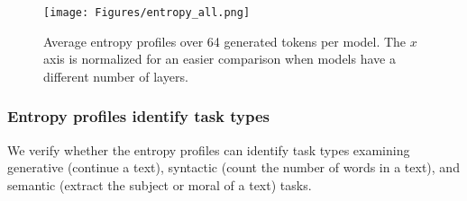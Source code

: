 
\begin{figure}[ht]
    \centering
    \texttt{[image: Figures/entropy\_all.png]}
    \caption{Average entropy profiles over 64 generated tokens per model. The $x$ axis is normalized for an easier comparison when models have a different number of layers.}
    \label{fig:entropy_fingerprints}
\end{figure}

\subsubsection{Entropy profiles identify task types} \label{sec:exp-ts}
We verify whether the entropy profiles can identify task types examining generative (continue a text), syntactic (count the number of words in a text), and semantic (extract the subject or moral of a text) tasks.

